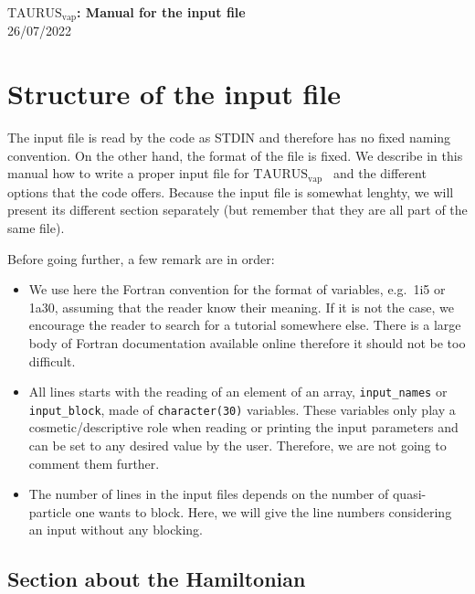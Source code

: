 \documentclass[a4paper,11pt]{article}
\newcommand{\TAURUSvap}{$\text{TAURUS}_{\text{vap}}$}
\newcommand{\ttt}[1]{\texttt{#1}}
\begin{document}
%
% 
\begin{center}
 {\LARGE \textbf{\TAURUSvap: Manual for the input file}} \\
 {\large 26/07/2022}
\end{center}

%
% 
\section{Structure of the input file}

The input file is read by the code as STDIN and therefore has no fixed naming convention. 
On the other hand, the format of the file is fixed. We describe in this manual how to write a proper input file for \TAURUSvap~
and the different options that the code offers.
Because the input file is somewhat lenghty, we will present its different section separately (but remember that they
are all part of the same file).
 
\noindent Before going further, a few remark are in order:
\begin{itemize}
  \item We use here the Fortran convention for the format of variables, e.g.\ 1i5 or 1a30, assuming that the reader
  know their meaning. If it is not the case, we encourage the reader to search for a tutorial somewhere else.
  There is a large body of Fortran documentation available online therefore it should not be too difficult.

  \item All lines starts with the reading of an element of an array, \ttt{input\_names} or \ttt{input\_block},
  made of \ttt{character(30)} variables. 
  These variables only play a cosmetic/descriptive role when reading or printing the input parameters and can be
  set to any desired value by the user. Therefore, we are not going to comment them further.

  \item The number of lines in the input files depends on the number of quasi-particle one wants to block. Here, we will give
  the line numbers considering an input without any blocking.
\end{itemize}

%
%
\subsection{Section about the Hamiltonian}
\end{document}
